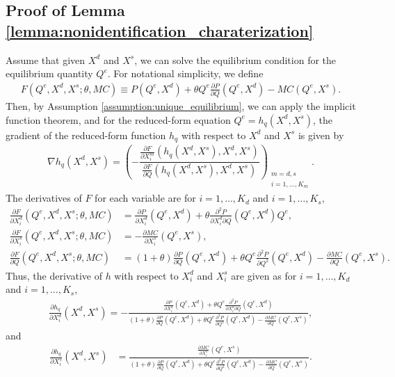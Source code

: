 \documentclass[11pt, a4paper]{article}
\theoremstyle{remark}
\begin{document}
\subsection{Proof of Lemma \ref{lemma:nonidentification_charaterization}}
Assume that given $X^{d}$ and $X^{s}$, we can solve the equilibrium condition for the equilibrium quantity $Q^e$.
For notational simplicity, we define
\begin{align}
    F(Q^e, X^{d}, X^{s}; \theta, MC) \equiv P(Q^e, X^{d}) + \theta Q^e\frac{\partial P}{\partial Q}(Q^e, X^{d}) - MC(Q^e, X^{s}).
\end{align}
Then, by Assumption \ref{assumption:unique_equilibrium}, we can apply the implicit function theorem, and for the reduced-form equation $Q^e = h_q(X^{d}, X^{s})$, the gradient of the reduced-form function $h_q$ with respect to $X^{d}$ and $X^{s}$ is given by
\begin{align}
    \nabla h_q(X^{d}, X^{s}) =  \left( -\dfrac{\frac{\partial F}{\partial X^{m}_{i}}(h_q(X^{d}, X^{s}), X^{d}, X^{s})}{\frac{\partial F}{\partial Q}(h_q(X^{d}, X^{s}), X^{d}, X^{s})} \right)_{\substack{m = d, s\\ i = 1, \ldots, K_m}}. \label{eq:foc_derivative_demand_supply}
\end{align}
The derivatives of $F$ for each variable are for $i = 1, \ldots, K_d$ and $i = 1, \ldots, K_s$,
\begin{align}
    \frac{\partial F}{\partial X^{d}_i}(Q^e, X^{d}, X^{s}; \theta, MC) & =  \frac{\partial P}{\partial X^{d}_{i}}(Q^e, X^{d}) + \theta\frac{\partial^2 P}{\partial X^{d}_{i}\partial Q}(Q^e, X^{d})Q^e,\\
    \frac{\partial F}{\partial X^{s}_i}(Q^e, X^{d}, X^{s}; \theta, MC) & =  -\frac{\partial MC}{\partial X^{s}_{i}}(Q^e, X^{s}), \\
    \frac{\partial F}{\partial Q}(Q^e, X^{d}, X^{s}; \theta, MC) & = (1+\theta)\frac{\partial P}{\partial Q}(Q^e, X^{d}) + \theta Q^e\frac{\partial^2 P}{\partial Q^2}(Q^e, X^{d}) - \frac{\partial MC}{\partial Q}(Q^e, X^{s}).
\end{align}
Thus, the derivative of $h$ with respect to $X^{d}_i$ and $X^{s}_i$ are given as for $i = 1, \ldots, K_d$ and $i = 1, \ldots, K_s$,
\begin{align}
    \frac{\partial h_q}{\partial X^{d}_{i}}(X^{d}, X^{s}) = -\frac{\frac{\partial P}{\partial X^{d}_{i}}(Q^e, X^{d}) + \theta Q^e \frac{\partial^2 P}{\partial X^{d}_{i}\partial Q}(Q^e, X^{d}) }{(1+\theta)\frac{\partial P}{\partial Q}(Q^e, X^{d}) + \theta  Q^e\frac{\partial^2 P}{\partial Q^2}(Q^e, X^{d}) - \frac{\partial MC}{\partial Q}(Q^e, X^{s})}, \label{eq:foc_derivative_demand}
\end{align}
and
\begin{align}
    \frac{\partial h_q}{\partial X^{s}_{i}}(X^{d}, X^{s}) & = \frac{\frac{\partial MC}{\partial X^{s}_{i}}(Q^e, X^{s})}{(1+\theta)\frac{\partial P}{\partial Q}(Q^e, X^{d}) + \theta  Q^e\frac{\partial^2 P}{\partial Q^2}(Q^e, X^{d}) - \frac{\partial MC}{\partial Q}(Q^e, X^{s})}. \label{eq:foc_derivative_supply}
\end{align}
\end{document}
